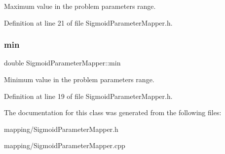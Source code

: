 Maximum value in the problem parameters range. 

Definition at line 21 of file Sigmoid\+Parameter\+Mapper.\+h.

\mbox{\label{classSigmoidParameterMapper_a55543b10e333cbe122bef3fdffbe1bf9}} 
\subsubsection{\texorpdfstring{min}{min}}
{\footnotesize\ttfamily double Sigmoid\+Parameter\+Mapper\+::min\hspace{0.3cm}{\ttfamily [private]}}

Minimum value in the problem parameters range. 

Definition at line 19 of file Sigmoid\+Parameter\+Mapper.\+h.



The documentation for this class was generated from the following files\+:\begin{DoxyCompactItemize}
\item 
mapping/Sigmoid\+Parameter\+Mapper.\+h\item 
mapping/Sigmoid\+Parameter\+Mapper.\+cpp\end{DoxyCompactItemize}
